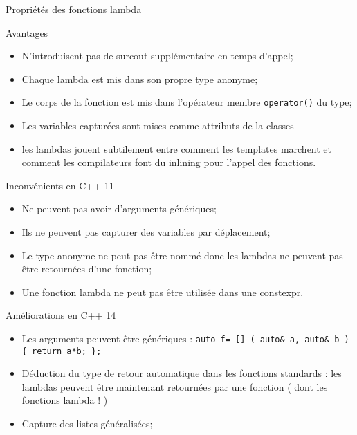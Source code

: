 \documentclass[handout,10pt]{beamer}
\begin{document}
\begin{frame}[fragile]{Propriétés des fonctions lambda}
\tiny
\begin{exampleblock}{Avantages}
\begin{itemize}
 \item N'introduisent pas de surcout supplémentaire en temps d'appel;
 \item Chaque lambda est mis dans son propre type anonyme;
 \item Le corps de la fonction est mis dans l'opérateur membre \lstinline$operator()$ du type;
 \item Les variables capturées sont mises comme attributs de la classes
 \item les lambdas jouent subtilement entre comment les templates marchent et comment les compilateurs font
 du inlining pour l'appel des fonctions.
\end{itemize}
\end{exampleblock}
\begin{alertblock}{Inconvénients en C++ 11}
\begin{itemize}
 \item Ne peuvent pas avoir d'arguments génériques;
 \item Ils ne peuvent pas capturer des variables par déplacement;
 \item Le type anonyme ne peut pas être nommé donc les lambdas ne peuvent pas être retournées d'une fonction;
 \item \alert{Une fonction lambda ne peut pas être utilisée dans une constexpr}.
\end{itemize}
\end{alertblock}
\begin{block}{Améliorations en C++ 14}
\begin{itemize}
 \item Les arguments peuvent être génériques : 
 \lstinline$auto f= [] ( auto& a, auto& b ) { return a*b; };$
 \item Déduction du type de retour automatique dans les fonctions standards : les lambdas peuvent être maintenant retournées
 par une fonction ( dont les fonctions lambda ! )
 \item Capture des listes généralisées;
\end{itemize}
\end{block}
\end{frame}
\end{document}
